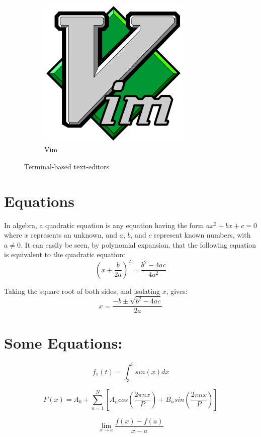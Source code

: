 \documentclass[14pt]{article}
\begin{document}
\begin{figure}[h]
\begin{subfigure}{0.3\textwidth}
			\includegraphics[width=0.8\textwidth]{vimlogo.png}
			\caption{Vim}
		\end{subfigure}
	\caption{Terminal-based text-editors}
	\end{figure}

	\section{Equations}
	In algebra, a quadratic equation is any equation having the form $ax^2+bx+c=0$ where $x$ represents an unknown, and $a$, $b$, and $c$ represent known numbers, with
	$a\neq0$. It can easily be seen, by polynomial expansion, that the following
	equation is equivalent to the quadratic equation:
	$${\left(x+\frac{b}{2a}\right)}^2=\frac{b^2-4ac}{4a^2}$$
	
	Taking the square root of both sides, and isolating $x$, gives:
	\begin{equation}
		x = \frac{-b\pm\sqrt{b^2-4ac}}{2a}
	\end{equation}
	
	\section*{Some Equations:}
	$$f_1(t) = \int_{3}^{5}sin(x)dx$$
	
	$$F(x) = A_0 + \sum_{n=1}^{N}\left[A_ncos\left(\frac{2\pi nx}{P}\right)+B_nsin\left(\frac{2\pi nx}{P}\right)\right]$$
	
	$$\lim\limits_{x\rightarrow a}\frac{f(x)-f(a)}{x - a}$$
	
\end{document}
